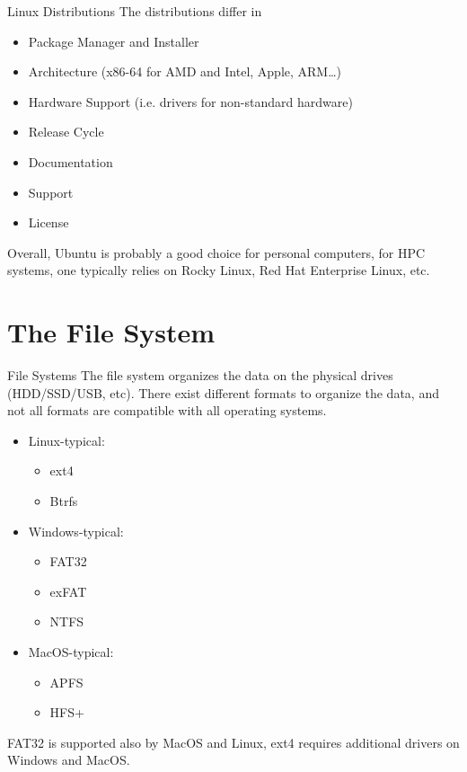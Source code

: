 \documentclass{setbeamer}
\begin{document}
\begin{frame}{Linux Distributions}
    The distributions differ in 
    \begin{itemize}
        \item Package Manager and Installer
        \item Architecture (x86-64 for AMD and Intel, Apple, ARM\dots) %
        \item Hardware Support (i.e. drivers for non-standard hardware) %
        \item Release Cycle 
        \item Documentation %
        \item Support %
        \item License
    \end{itemize}
    Overall, Ubuntu is probably a good choice for personal computers, for HPC systems, one typically relies on Rocky Linux, Red Hat Enterprise Linux, etc.
\end{frame}

\section{The File System}

\begin{frame}{File Systems}
    The file system organizes the data on the physical drives (HDD/SSD/USB, etc). There exist different formats to organize the data, and not all formats are compatible with all operating systems.
    \begin{itemize}
        \item Linux-typical:
        \begin{itemize}
            \item ext4
            \item Btrfs
        \end{itemize}
        \item Windows-typical:
        \begin{itemize}
            \item FAT32 %
            \item exFAT
            \item NTFS
        \end{itemize}
        \item MacOS-typical:
        \begin{itemize}
            \item APFS
            \item HFS+
        \end{itemize}
    \end{itemize}
    FAT32 is supported also by MacOS and Linux, ext4 requires additional drivers on Windows and MacOS.
\end{frame}
\end{document}
